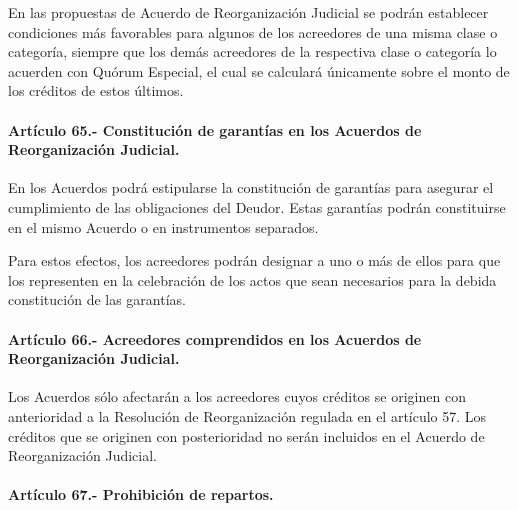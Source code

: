 \documentclass[
]{book}
\begin{document}
En las propuestas de Acuerdo de Reorganización Judicial se podrán establecer condiciones más favorables para algunos de los acreedores de una misma clase o categoría, siempre que los demás acreedores de la respectiva clase o categoría lo acuerden con Quórum Especial, el cual se calculará únicamente sobre el monto de los créditos de estos últimos.

\hypertarget{artuxedculo-65.--constituciuxf3n-de-garantuxedas-en-los-acuerdos-de-reorganizaciuxf3n-judicial.}{%
\paragraph*{Artículo 65.- Constitución de garantías en los Acuerdos de Reorganización Judicial.}\label{artuxedculo-65.--constituciuxf3n-de-garantuxedas-en-los-acuerdos-de-reorganizaciuxf3n-judicial.}}

En los Acuerdos podrá estipularse la constitución de garantías para asegurar el cumplimiento de las obligaciones del Deudor. Estas garantías podrán constituirse en el mismo Acuerdo o en instrumentos separados.

Para estos efectos, los acreedores podrán designar a uno o más de ellos para que los representen en la celebración de los actos que sean necesarios para la debida constitución de las garantías.

\hypertarget{artuxedculo-66.--acreedores-comprendidos-en-los-acuerdos-de-reorganizaciuxf3n-judicial.}{%
\paragraph*{Artículo 66.- Acreedores comprendidos en los Acuerdos de Reorganización Judicial.}\label{artuxedculo-66.--acreedores-comprendidos-en-los-acuerdos-de-reorganizaciuxf3n-judicial.}}

Los Acuerdos sólo afectarán a los acreedores cuyos créditos se originen con anterioridad a la Resolución de Reorganización regulada en el artículo 57.
Los créditos que se originen con posterioridad no serán incluidos en el Acuerdo de Reorganización Judicial.

\hypertarget{artuxedculo-67.--prohibiciuxf3n-de-repartos.}{%
\paragraph*{Artículo 67.- Prohibición de repartos.}\label{artuxedculo-67.--prohibiciuxf3n-de-repartos.}}
\end{document}
